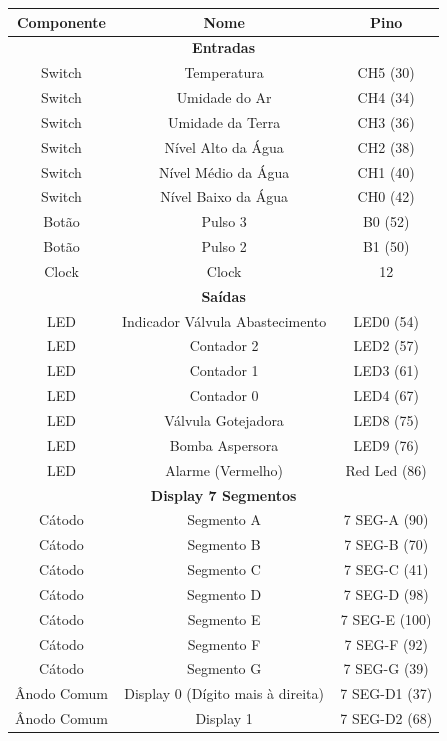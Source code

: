 \documentclass[
	article,			%
	11pt,				%
	oneside,			%
	a4paper,			%
	english,			%
	brazil,				%
	sumario=tradicional
	]{abntex2}
\begin{document}
\begin{table}[H]
\centering
\begin{tabular}{|c|c|c|}
\hline
\textbf{Componente} & \textbf{Nome} & \textbf{Pino} \\ \hline
\multicolumn{3}{|c|}{\textbf{Entradas}} \\ \hline
Switch & Temperatura & CH5 (30) \\ \hline
Switch & Umidade do Ar & CH4 (34) \\ \hline
Switch & Umidade da Terra & CH3 (36) \\ \hline
Switch & Nível Alto da Água & CH2 (38) \\ \hline
Switch & Nível Médio da Água & CH1 (40) \\ \hline
Switch & Nível Baixo da Água & CH0 (42) \\ \hline
Botão & Pulso 3 & B0 (52) \\ \hline
Botão & Pulso 2 & B1 (50) \\ \hline
Clock & Clock & 12 \\ \hline
\multicolumn{3}{|c|}{\textbf{Saídas}} \\ \hline
LED & Indicador Válvula Abastecimento & LED0 (54) \\ \hline
LED & Contador 2 & LED2 (57) \\ \hline
LED & Contador 1 & LED3 (61) \\ \hline
LED & Contador 0 & LED4 (67) \\ \hline
LED & Válvula Gotejadora & LED8 (75) \\ \hline
LED & Bomba Aspersora & LED9 (76) \\ \hline
LED & Alarme (Vermelho) & Red Led (86) \\ \hline
\multicolumn{3}{|c|}{\textbf{Display 7 Segmentos}} \\ \hline
Cátodo & Segmento A & 7 SEG-A (90) \\ \hline
Cátodo & Segmento B & 7 SEG-B (70) \\ \hline
Cátodo & Segmento C & 7 SEG-C (41) \\ \hline
Cátodo & Segmento D & 7 SEG-D (98) \\ \hline
Cátodo & Segmento E & 7 SEG-E (100) \\ \hline
Cátodo & Segmento F & 7 SEG-F (92) \\ \hline
Cátodo & Segmento G & 7 SEG-G (39) \\ \hline
Ânodo Comum & Display 0 (Dígito mais à direita) & 7 SEG-D1 (37) \\ \hline
Ânodo Comum & Display 1 & 7 SEG-D2 (68) \\ \hline

\end{tabular}
\end{table}
\end{document}

